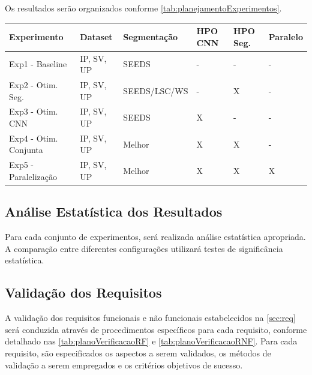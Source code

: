 Os resultados serão organizados conforme \autoref{tab:planejamentoExperimentos}.

\begin{quadro}[H]
    \centering
    \caption{Planejamento de experimentos}
    \begin{tabular}{|p{}|p{}|p{}|p{}|p{}|p{}|}
        \hline
        \rowcolor[HTML]{C0C0C0}
        \textbf{Experimento} & \textbf{Dataset} & \textbf{Segmentação} & \textbf{HPO CNN} & \textbf{HPO Seg.} & \textbf{Paralelo} \\
        \hline
        
        Exp1 - Baseline & IP, SV, UP & SEEDS & - & - & - \\
        \hline
        
        Exp2 - Otim. Seg. & IP, SV, UP & SEEDS/LSC/WS & - & X & - \\
        \hline
        
        Exp3 - Otim. CNN & IP, SV, UP & SEEDS & X & - & - \\
        \hline
        
        Exp4 - Otim. Conjunta & IP, SV, UP & Melhor & X & X & - \\
        \hline
        
        Exp5 - Paralelização & IP, SV, UP & Melhor & X & X & X \\
        \hline
    \end{tabular}
    \label{tab:planejamentoExperimentos}
\end{quadro}

\subsection{Análise Estatística dos Resultados}

Para cada conjunto de experimentos, será realizada análise estatística apropriada. A comparação entre diferentes configurações utilizará testes de significância estatística.

\subsection{Validação dos Requisitos}

A validação dos requisitos funcionais e não funcionais estabelecidos na \autoref{sec:req} será conduzida através de procedimentos específicos para cada requisito, conforme detalhado nas \autoref{tab:planoVerificacaoRF} e \autoref{tab:planoVerificacaoRNF}. Para cada requisito, são especificados os aspectos a serem validados, os métodos de validação a serem empregados e os critérios objetivos de sucesso.

